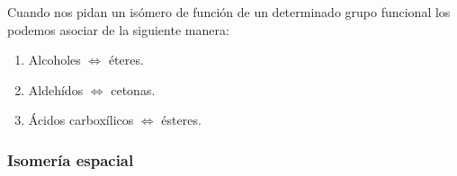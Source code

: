 \begin{enumerate}[label=\numberballmDarkTeal]

    Cuando nos pidan un isómero de función de un determinado grupo funcional los podemos asociar de la siguiente manera:

    \begin{enumerate}
        \item Alcoholes \(\iff\) éteres.
        \item Aldehídos \(\iff\) cetonas.
        \item Ácidos carboxílicos \(\iff\) ésteres.
    \end{enumerate}
\end{enumerate}

\subsubsection{Isomería espacial}

